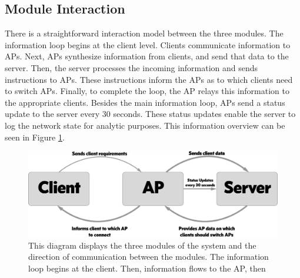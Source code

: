 \documentclass[10pt,journal,compsoc]{IEEEtran}
\begin{document}
		\subsection{Module Interaction}
		There is a straightforward interaction model between the three modules. The information loop begins at the client level. Clients communicate information to APs. Next, APs synthesize information from clients, and send that data to the server. Then, the server processes the incoming information and sends instructions to APs. These instructions inform the APs as to which clients need to switch APs. Finally, to complete the loop, the AP relays this information to the appropriate clients. Besides the main information loop, APs send a status update to the server every 30 seconds. These status updates enable the server to log the network state for analytic purposes. This information overview can be seen in Figure \ref{fig:overview}. 
		
        \begin{figure}
            \includegraphics[width=\linewidth]{overviewDiagram.png}
            \caption{This diagram displays the three modules of the system and the direction of communication between the modules. The information loop begins at the client. Then, information flows to the AP, then }
            \label{fig:overview}
        \end{figure}
		
		
\end{document}
